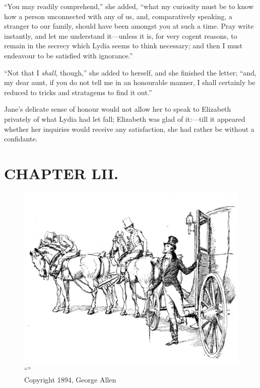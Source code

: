 ``You may readily comprehend,'' she added, ``what my curiosity must be to know how a person unconnected with any of us, and, comparatively speaking, a stranger to our family, should have been amongst you at such a time. Pray write instantly, and let me understand it---unless it is, for very cogent reasons, to remain in the secrecy which Lydia seems to think necessary; and then I must endeavour to be satisfied with ignorance.''

``Not that I \textit{shall}, though,'' she added to herself, and she finished the letter; ``and, my dear aunt, if you do not tell me in an honourable manner, I shall certainly be reduced to tricks and stratagems to find it out.''

Jane's delicate sense of honour would not allow her to speak to Elizabeth privately of what Lydia had let fall; Elizabeth was glad of it:---till it appeared whether her inquiries would receive any satisfaction, she had rather be without a confidante.



\chapter{CHAPTER LII.}

\begin{figure}[htbp]
    \centering
    \includegraphics[width=\textwidth]{illustrations/i_031.jpg}
    \caption{“”\\ Copyright 1894, George Allen}
    \label{fig:image}
\end{figure}


